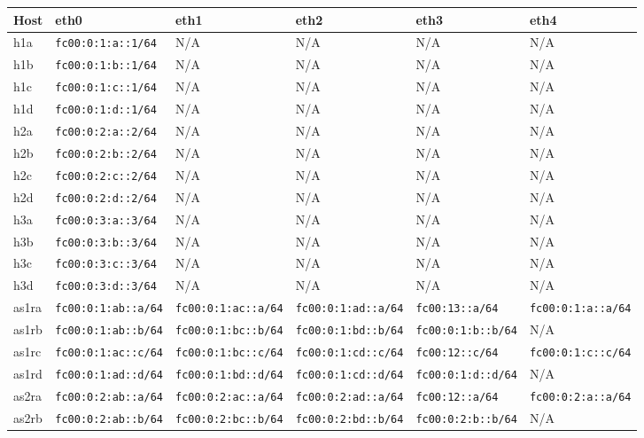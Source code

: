 \begin{table}[h]
\centering
\footnotesize
\renewcommand{\arraystretch}{1.2}
\begin{tabular}{|l|l|l|l|l|l|}
\hline
\textbf{Host} & \textbf{eth0} & \textbf{eth1} & \textbf{eth2} & \textbf{eth3} & \textbf{eth4} \\
\hline
h1a & \texttt{fc00:0:1:a::1/64}  & N/A & N/A & N/A & N/A \\
h1b & \texttt{fc00:0:1:b::1/64}  & N/A & N/A & N/A & N/A \\
h1c & \texttt{fc00:0:1:c::1/64}  & N/A & N/A & N/A & N/A \\
h1d & \texttt{fc00:0:1:d::1/64}  & N/A & N/A & N/A & N/A \\
\hline
h2a & \texttt{fc00:0:2:a::2/64}  & N/A & N/A & N/A & N/A \\
h2b & \texttt{fc00:0:2:b::2/64}  & N/A & N/A & N/A & N/A \\
h2c & \texttt{fc00:0:2:c::2/64}  & N/A & N/A & N/A & N/A \\
h2d & \texttt{fc00:0:2:d::2/64}  & N/A & N/A & N/A & N/A \\
\hline
h3a & \texttt{fc00:0:3:a::3/64}  & N/A & N/A & N/A & N/A \\
h3b & \texttt{fc00:0:3:b::3/64}  & N/A & N/A & N/A & N/A \\
h3c & \texttt{fc00:0:3:c::3/64}  & N/A & N/A & N/A & N/A \\
h3d & \texttt{fc00:0:3:d::3/64}  & N/A & N/A & N/A & N/A \\
\hline
as1ra & \texttt{fc00:0:1:ab::a/64} & \texttt{fc00:0:1:ac::a/64} & \texttt{fc00:0:1:ad::a/64} & \texttt{fc00:13::a/64}   & \texttt{fc00:0:1:a::a/64} \\
as1rb & \texttt{fc00:0:1:ab::b/64} & \texttt{fc00:0:1:bc::b/64} & \texttt{fc00:0:1:bd::b/64} & \texttt{fc00:0:1:b::b/64} & N/A \\
as1rc & \texttt{fc00:0:1:ac::c/64} & \texttt{fc00:0:1:bc::c/64} & \texttt{fc00:0:1:cd::c/64} & \texttt{fc00:12::c/64}   & \texttt{fc00:0:1:c::c/64} \\
as1rd & \texttt{fc00:0:1:ad::d/64} & \texttt{fc00:0:1:bd::d/64} & \texttt{fc00:0:1:cd::d/64} & \texttt{fc00:0:1:d::d/64} & N/A \\
\hline
as2ra & \texttt{fc00:0:2:ab::a/64} & \texttt{fc00:0:2:ac::a/64} & \texttt{fc00:0:2:ad::a/64} & \texttt{fc00:12::a/64}   & \texttt{fc00:0:2:a::a/64} \\
as2rb & \texttt{fc00:0:2:ab::b/64} & \texttt{fc00:0:2:bc::b/64} & \texttt{fc00:0:2:bd::b/64} & \texttt{fc00:0:2:b::b/64} & N/A \\

\end{tabular}
\end{table}
